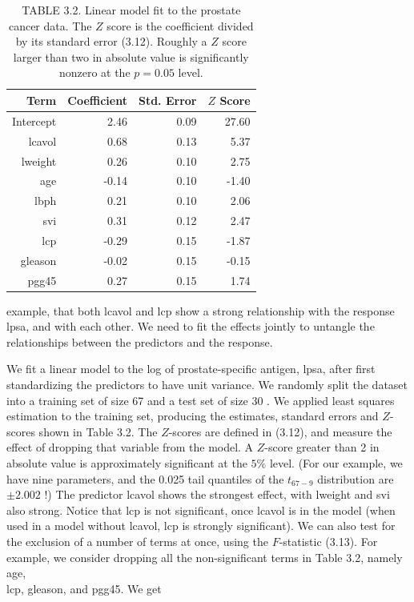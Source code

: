 \documentclass[10pt]{article}
\begin{document}
\begin{table}[h]
\begin{center}
\captionsetup{labelformat=empty}
\caption{TABLE 3.2. Linear model fit to the prostate cancer data. The $Z$ score is the coefficient divided by its standard error (3.12). Roughly a $Z$ score larger than two in absolute value is significantly nonzero at the $p=0.05$ level.}
\begin{tabular}{rrrr}
\hline
Term & Coefficient & Std. Error & $Z$ Score \\
\hline
Intercept & 2.46 & 0.09 & 27.60 \\
lcavol & 0.68 & 0.13 & 5.37 \\
lweight & 0.26 & 0.10 & 2.75 \\
age & -0.14 & 0.10 & -1.40 \\
lbph & 0.21 & 0.10 & 2.06 \\
svi & 0.31 & 0.12 & 2.47 \\
lcp & -0.29 & 0.15 & -1.87 \\
gleason & -0.02 & 0.15 & -0.15 \\
pgg45 & 0.27 & 0.15 & 1.74 \\
\hline
\end{tabular}
\end{center}
\end{table}

example, that both lcavol and lcp show a strong relationship with the response lpsa, and with each other. We need to fit the effects jointly to untangle the relationships between the predictors and the response.

We fit a linear model to the log of prostate-specific antigen, lpsa, after first standardizing the predictors to have unit variance. We randomly split the dataset into a training set of size 67 and a test set of size 30 . We applied least squares estimation to the training set, producing the estimates, standard errors and $Z$-scores shown in Table 3.2. The $Z$-scores are defined in (3.12), and measure the effect of dropping that variable from the model. A $Z$-score greater than 2 in absolute value is approximately significant at the $5 \%$ level. (For our example, we have nine parameters, and the 0.025 tail quantiles of the $t_{67-9}$ distribution are $\pm 2.002$ !) The predictor lcavol shows the strongest effect, with lweight and svi also strong. Notice that lcp is not significant, once lcavol is in the model (when used in a model without lcavol, lcp is strongly significant). We can also test for the exclusion of a number of terms at once, using the $F$-statistic (3.13). For example, we consider dropping all the non-significant terms in Table 3.2, namely age,\\
lcp, gleason, and pgg45. We get
\end{document}
